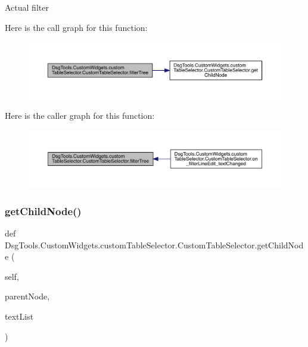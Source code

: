 \begin{DoxyVerb}Actual filter
\end{DoxyVerb}
 Here is the call graph for this function\+:
\nopagebreak
\begin{figure}[H]
\begin{center}
\leavevmode
\includegraphics[width=350pt]{class_dsg_tools_1_1_custom_widgets_1_1custom_table_selector_1_1_custom_table_selector_af58cd7feefe930b6bb5a2e669e79c6a3_cgraph}
\end{center}
\end{figure}
Here is the caller graph for this function\+:
\nopagebreak
\begin{figure}[H]
\begin{center}
\leavevmode
\includegraphics[width=350pt]{class_dsg_tools_1_1_custom_widgets_1_1custom_table_selector_1_1_custom_table_selector_af58cd7feefe930b6bb5a2e669e79c6a3_icgraph}
\end{center}
\end{figure}
\mbox{\label{class_dsg_tools_1_1_custom_widgets_1_1custom_table_selector_1_1_custom_table_selector_a3bc4894af63d0aac442960b7647bafb8}} 
\subsubsection{\texorpdfstring{get\+Child\+Node()}{getChildNode()}}
{\footnotesize\ttfamily def Dsg\+Tools.\+Custom\+Widgets.\+custom\+Table\+Selector.\+Custom\+Table\+Selector.\+get\+Child\+Node (\begin{DoxyParamCaption}\item[{}]{self,  }\item[{}]{parent\+Node,  }\item[{}]{text\+List }\end{DoxyParamCaption})}

